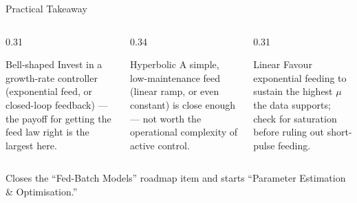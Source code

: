 \documentclass[aspectratio=169, 11pt]{beamer}
\begin{document}
\begin{frame}{Practical Takeaway}
  \begin{columns}[T]
    \begin{column}{0.31\textwidth}
      \begin{block}{Bell-shaped}
        \centering
        \small Invest in a growth-rate controller (exponential feed, or closed-loop
        feedback) --- the payoff for getting the feed law right is the largest here.
      \end{block}
    \end{column}
    \begin{column}{0.34\textwidth}
      \begin{block}{Hyperbolic}
        \centering
        \small A simple, low-maintenance feed (linear ramp, or even constant) is
        close enough --- not worth the operational complexity of active control.
      \end{block}
    \end{column}
    \begin{column}{0.31\textwidth}
      \begin{block}{Linear}
        \centering
        \small Favour exponential feeding to sustain the highest $\mu$ the data
        supports; check for saturation before ruling out short-pulse feeding.
      \end{block}
    \end{column}
  \end{columns}

  \vspace{0.3cm}
  {\small Closes the ``Fed-Batch Models'' roadmap item and starts ``Parameter
  Estimation \& Optimisation.''}
\end{frame}
\end{document}
